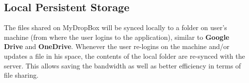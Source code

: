 \documentclass[18pt]{article}
\begin{document}
		\subsection{Local Persistent Storage}
			The files shared on MyDropBox will be synced locally to a folder on user's machine (from where the user logins to the application), similar to \textbf{Google Drive} and \textbf{OneDrive}. Whenever the user re-logins on the machine and/or updates a file in his space, the contents of the local folder are re-synced with the server. This allows saving the bandwidth as well as better efficiency in terms of file sharing.

	\endgroup
\end{document}
